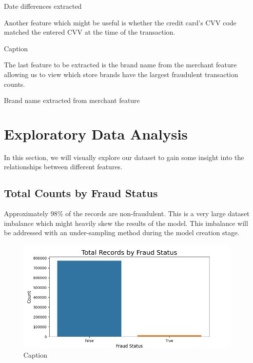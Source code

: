\documentclass[12pt]{article}
\begin{document}
\begin{table}[h]
    \centering
    \resizebox{\textwidth}{!}{%
     }
    \caption{Date differences extracted}
    \label{tab:my_label}
\end{table}

Another feature which might be useful is whether the credit card's CVV code matched the entered CVV at the time of the transaction.

\begin{table}[h]
    \centering
    
    \caption{Caption}
    \label{tab:my_label}
\end{table}

The last feature to be extracted is the brand name from the merchant feature allowing us to view which store brands have the largest fraudulent transaction counts.

\begin{table}[h]
    \centering
    
    \caption{Brand name extracted from merchant feature}
    \label{tab:merchant_brand_table}
\end{table}

\newpage
\section{Exploratory Data Analysis}
In this section, we will visually explore our dataset to gain some insight into the relationships between different features.
\subsection{Total Counts by Fraud Status}
Approximately 98\% of the records are non-fraudulent. This is a very large dataset imbalance which might heavily skew the results of the model. This imbalance will be addressed with an under-sampling method during the model creation stage.
\begin{figure}[h]
    \centering
    \includegraphics[width=\textwidth]{images/isFraud_counts.png}
    \caption{Caption}
    \label{fig:isFraud_counts}
\end{figure}
\newpage
\end{document}
